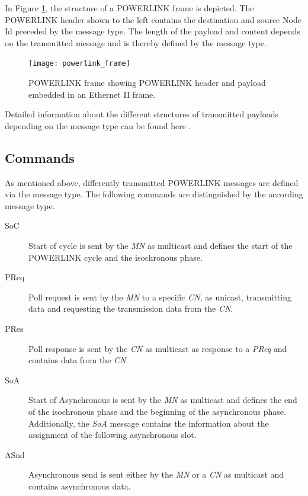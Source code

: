 In Figure \ref{fig:powerlink_frame}, the structure of a POWERLINK frame is depicted.
The POWERLINK header shown to the left contains the destination and source Node Id preceded by the message type.
The length of the payload and content depends on the transmitted message and is thereby defined by the message type. \cite[section 4.6.1.1]{epsg_epsg_2013}

\begin{figure}
    \centering
    \texttt{[image: powerlink\_frame]}
    \caption{POWERLINK frame showing POWERLINK header and payload embedded in an Ethernet II frame.}
    \label{fig:powerlink_frame}
\end{figure}

Detailed information about the different structures of transmitted payloads depending on the message type can be found here \cite[section 4.6.1.1.1]{epsg_epsg_2013}.

\subsection{Commands}
\label{sec:oplk_powerlink_commands}

As mentioned above, differently transmitted POWERLINK messages are defined via the message type.
The following commands are distinguished by the according message type.

\begin{description}
    \item[SoC] Start of cycle is sent by the \emph{MN} as multicast and defines the start of the POWERLINK cycle and the isochronous phase.
    \item[PReq] Poll request is sent by the \emph{MN} to a specific \emph{CN}, as unicast, transmitting data and requesting the transmission data from the \emph{CN}.
    \item[PRes] Poll response is sent by the \emph{CN} as multicast as response to a \emph{PReq} and contains data from the \emph{CN}.
    \item[SoA] Start of Asynchronous is sent by the \emph{MN} as multicast and defines the end of the isochronous phase and the beginning of the asynchronous phase.
    Additionally, the \emph{SoA} message contains the information about the assignment of the following asynchronous slot.
    \item[ASnd] Asynchronous send is sent either by the \emph{MN} or a \emph{CN} as multicast and contains asynchronous data.
\end{description}


